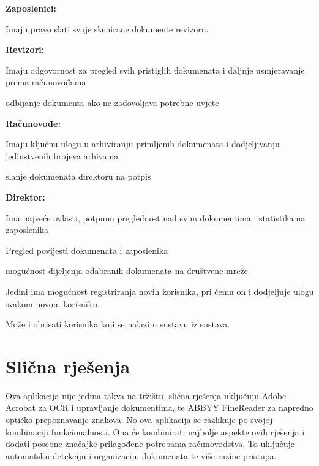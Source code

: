 		\begin{packed_item}
			\item \textbf{Zaposlenici:} 
					\begin{packed_item}
						\item Imaju pravo slati svoje skenirane dokumente revizoru.
					\end{packed_item}
			\item \textbf{Revizori:} 
					\begin{packed_item}
						\item Imaju odgovornost za pregled svih pristiglih dokumenata i daljnje usmjeravanje prema računovođama
						\item odbijanje dokumenta ako ne zadovoljava potrebne uvjete 
					\end{packed_item}
			\item \textbf{Računovođe:} 
						\begin{packed_item}
						\item Imaju ključnu ulogu u arhiviranju primljenih dokumenata i dodjeljivanju jedinstvenih brojeva arhivama
						\item slanje dokumenata direktoru na potpis
					\end{packed_item}
			\item \textbf{Direktor:}
						\begin{packed_item} 
							\item Ima najveće ovlasti, potpunu preglednost nad svim dokumentima i statistikama zaposlenika
							\item Pregled povijesti dokumenata i zaposlenika
							\item mogućnost dijeljenja odabranih dokumenata na društvene mreže
							\item Jedini ima mogućnost registriranja novih korisnika, pri čemu on i dodjeljuje ulogu svakom novom korisniku. 
							\item Može i obrisati korisnika koji se nalazi u sustavu iz sustava.
						\end{packed_item}
		\end{packed_item}
		
		\section{Slična rješenja}
		
		Ova aplikacija nije jedina takva na tržištu, slična rješenja uključuju Adobe Acrobat za OCR i upravljanje dokumentima, te ABBYY FineReader za napredno optičko prepoznavanje znakova. No ova aplikacija se razlikuje po svojoj kombinaciji funkcionalnosti. Ona će kombinirati najbolje aspekte ovih rješenja i dodati posebne značajke prilagođene potrebama računovodstva. To uključuje automatsku detekciju i organizaciju dokumenata te više razine pristupa.

